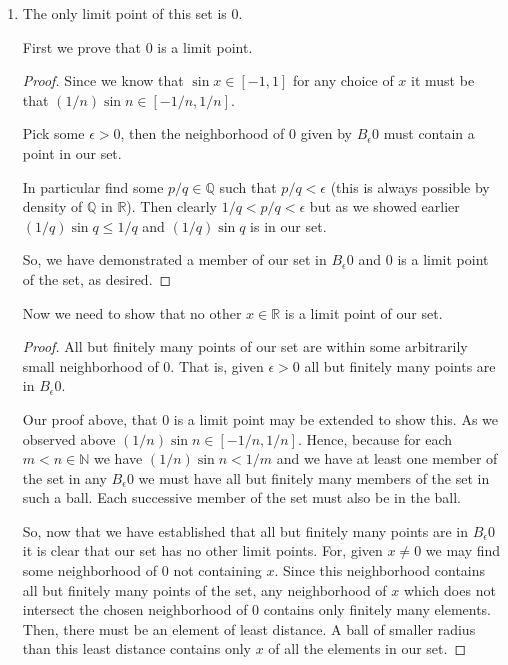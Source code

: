 \documentclass[10pt]{article}
\begin{document}
\begin{enumerate}
\begin{proof}
However, there is but a finite set of such $m$ as we have previously demonstrated. Thus, each $B_\epsilon x$ must contain a point of the form  $1/n+1/m$ for some $n \in \mathbb{N}$ and $m$ one of a finite set of points. Yet, the limit points of a finite union consist of the union of the limit points, and we know by Lemma \ref{easy} that the limit points of $\{a+1/m\ |\ m \in \mathbb{N}\}$ is just $a$. So, this is a contradiction as $x \notin E$ is not of the form $1/m\ m \in \mathbb{N}$.\end{proof}

\item The only limit point of this set is $0$.

First we prove that $0$ is a limit point.
\begin{proof} Since we know that $\sin{x} \in [-1,1]$ for any choice of $x$ it must be that $(1/n) \sin{n} \in [-1/n,1/n]$.

 Pick some $\epsilon >0$, then the neighborhood of $0$ given by $B_\epsilon 0$ must contain a point in our set. 
 
 In particular find some $p/q \in \mathbb{Q}$ such that $p/q < \epsilon$ (this is always possible by density of $\mathbb{Q}$ in $\mathbb{R}$). Then clearly $1/q<p/q<\epsilon$ but as we showed earlier $(1/q)\sin{q}\leq 1/q$ and $(1/q)\sin{q}$ is in our set. 
 
 So, we have demonstrated a member of our set in $B_\epsilon 0$ and $0$ is a limit point of the set, as desired.
\end{proof}

Now we need to show that no other $x \in \mathbb{R}$ is a limit point of our set.

\begin{proof}
All but finitely many points of our set are within some arbitrarily small neighborhood of $0$. That is, given $\epsilon>0$ all but finitely many points are in $B_\epsilon 0$. 

Our proof above, that $0$ is a limit point may be extended to show this. As we observed above $(1/n) \sin{n} \in [-1/n,1/n]$. Hence, because for each $m<n \in \mathbb{N}$ we have $(1/n)\sin{n}<1/m$ and we have at least one member of the set in any $B_\epsilon 0$ we must have all but finitely many members of the set in such a ball. Each successive member of the set must also be in the ball.

So, now that we have established that all but finitely many points are in $B_\epsilon 0$ it is clear that our set has no other limit points. For, given $x \neq 0$ we may find some neighborhood of $0$ not containing $x$. Since this neighborhood contains all but finitely many points of the set, any neighborhood of $x$ which does not intersect the chosen neighborhood of $0$ contains only finitely many elements. Then, there must be an element of least distance. A ball of smaller radius than this least distance contains only $x$ of all the elements in our set.


\end{proof}
\end{enumerate}
\end{document}
